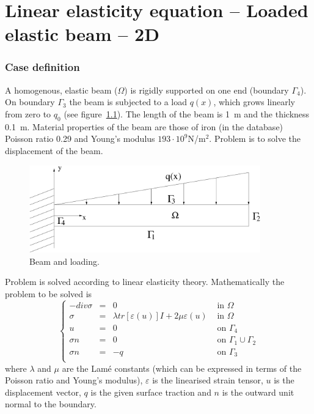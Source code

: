 \chapter{Linear elasticity equation -- Loaded elastic beam -- 2D}



\subsection*{Case definition}

A homogenous, elastic beam ($\Omega$) is rigidly supported on one 
end (boundary $\Gamma_4$). On boundary $\Gamma_3$ the beam is subjected 
to a load $q(x)$, which grows linearly from zero to $q_0$ 
(see figure~\ref{fg:beam}). The length of the beam is 1~m and the thickness 0.1~m.
Material properties of the beam are those of iron (in the database) Poisson 
ratio 0.29 and Young's modulus $193\cdot 10^9$N/m$^2$. Problem is to solve the 
displacement of the beam.  

\begin{figure}[h]
\centering
\includegraphics[width=100mm]{Beam}
\caption{Beam and loading.}\label{fg:beam}
\end{figure}

Problem is solved according to linear elasticity theory. Mathematically 
the problem to be solved is
\begin{equation}
\left \{
\begin{array}{rcll}
-div \sigma & = & 0 & \mbox{ in } \Omega \\
\sigma & = & \lambda tr [\varepsilon(u)]I + 2 \mu \varepsilon(u) &
\mbox{ in } \Omega \\
u & = & 0 & \mbox{ on } \Gamma_4 \\
\sigma n & = & 0 & \mbox{ on } \Gamma_1 \cup \Gamma_2 \\
\sigma n & = & -q & \mbox{ on } \Gamma_3 \\
\end{array}
\right .
\end{equation}
where $\lambda$ and $\mu$ are the Lam\'{e} constants (which can be expressed 
in terms of the Poisson ratio and Young's modulus), $\varepsilon$ is the 
linearised strain tensor, $u$ is the displacement vector, $q$ is the given
surface traction and $n$ is the outward unit normal to the boundary.



